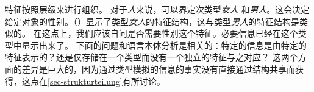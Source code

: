 特征按照层级来进行组织。
对于\textit{人}来说，可以界定次类型\textit{女人} 和\textit{男人}。这会决定给定对象的性别。（）显示了类型\textit{女人}的特征结构，这与类型\textit{男人}的特征结构是类似的。
\ea
{}
\z
在这点上，我们应该自问是否需要\textsc{性别}这个特征。必要信息已经在这个类型中显示出来了。
下面的问题和语言本体分析是相关的：特定的信息是由特定的特征表示的？还是仅存储在一个类型而没有一个独立的特征与之对应？
这两个方面的差异是巨大的，因为通过类型模拟的信息的事实没有直接通过结构共享而获得，这点在\ref{sec-strukturteilung}有所讨论。

